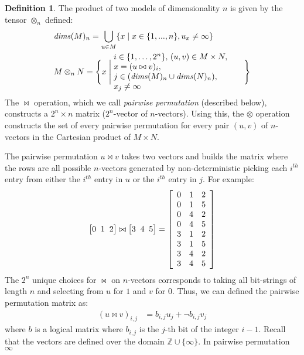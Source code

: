 \documentclass[9pt]{sigplanconf}
\newcounter{block}
\theoremstyle{definition}
\newtheorem{definition}[block]{Definition}
\newcommand{\vthreeh}[3]{\setlength{\arraycolsep}{0em}
\left[\begin{array}{ccc}#1 \; & \; #2 \; & \; #3\end{array}\right]}
\begin{document}
\begin{definition}The product of two models of dimensionality
$n$ is given by the tensor $\otimes_n$ defined:
\newcommand{\effdims}[2]{\mathit{dims}(#1)_{#2}}
\begin{alignat*}{2}
& \effdims{M}{n} =
\bigcup_{u \in M} \{x \mid x \in \{1,...,n\}, u_x \neq \infty\} \\
& M \otimes_n N =
  \Bigg\{x \; \Bigg| \;
    \parbox{5.6cm}{$i \in \{1, \ldots, 2^n\},$
                   $(u, v) \in M \times N,$ \\
                   $x = (u \bowtie v)_i,$ \\
                   $j \in (\effdims{M}{n} \cup \effdims{N}{n}),$ \\
                   $x_j \neq \infty$
                  } \Bigg\}
\end{alignat*}
The $\bowtie$ operation, which we call \emph{pairwise permutation}
(described below), constructs a $2^n \times n$ matrix ($2^n$-vector of
$n$-vectors). Using this, the $\otimes$ operation constructs the set of every
pairwise permutation for every pair $(u, v)$ of $n$-vectors in the Cartesian
product of $M \times N$.

The pairwise permutation $u \bowtie v$ takes two vectors and builds the matrix
where the rows are all possible $n$-vectors generated by
non-deterministic picking each $i^{th}$ entry from either the
$i^{th}$ entry in $u$ or the $i^{th}$ entry in $j$. For example:
%
\begin{equation*}
\vthreeh{0}{1}{2} \bowtie \vthreeh{3}{4}{5} =
\setlength{\arraycolsep}{0.5em}
\left[\begin{array}{ccc}
0 & 1 & 2 \\
0 & 1 & 5 \\
0 & 4 & 2 \\
0 & 4 & 5 \\
3 & 1 & 2 \\
3 & 1 & 5 \\
3 & 4 & 2 \\
3 & 4 & 5
\end{array}
\right]
\end{equation*}
%
The $2^n$ unique choices for $\bowtie$ on $n$-vectors
corresponds to taking all bit-strings of length $n$ and
selecting from $u$ for $1$ and $v$ for $0$. Thus, we can
defined the pairwise permutation matrix as:
%
\begin{align*}
(u \bowtie v)_{i,j} & = b_{i,j} u_j + \neg b_{i,j} v_j
\end{align*}
%
where $b$ is a logical matrix where $b_{i,j}$ is the $j$-th bit of the integer
$i - 1$. Recall that the vectors are defined over the domain $\mathbb{Z} \cup
\{\infty\}$. In pairwise permutation $\infty$

\end{definition}
\end{document}
